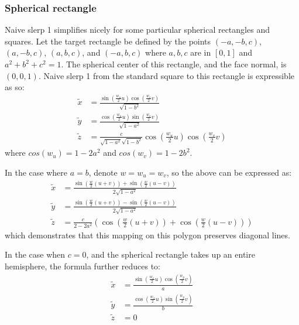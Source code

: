 \documentclass{amsart}[12pt]
\begin{document}
\subsubsection{Spherical rectangle}
Naive slerp 1 simplifies nicely for some particular spherical rectangles and
squares. Let the target rectangle be defined by the points $(-a,-b,c)$,
$(a,-b,c)$, $(a,b,c)$, and $(-a,b,c)$ where $a, b, c$ are in $[0,1]$ and
$a^2 + b^2 + c^2 = 1$. The spherical center of this rectangle, and the face
normal, is $(0,0,1)$. Naive slerp 1 from the standard square to this rectangle
is expressible as so:
\begin{equation}\begin{split}
  \widetilde{x} &= \frac{\sin(\frac{w_u}{2}u) \cos(\frac{w_v}{2}v) }
    {\sqrt{1-b^2}}\\
  \widetilde{y} &= \frac{\cos(\frac{w_u}{2}u) \sin(\frac{w_v}{2}v) }
    {\sqrt{1-a^2}}\\
  \widetilde{z} &=\frac{c}{\sqrt{1-a^2}\sqrt{1-b^2}}
    \cos(\frac{w_u}{2}u) \cos(\frac{w_v}{2}v)
\end{split}\end{equation}
where $cos(w_u) = 1 - 2 a^2$ and $cos(w_v) = 1 - 2 b^2$.

In the case where $a=b$, denote $w = w_u = w_v$,
so the above can be expressed as:
\begin{equation}\begin{split}
  \widetilde{x} &= \frac{\sin\left(\frac{w}{2}(u+v)\right) +
    \sin\left(\frac{w}{2}(u-v)\right)}
    {2\sqrt{1-a^2}}\\
  \widetilde{y} &= \frac{\sin\left(\frac{w}{2}(u+v)\right) -
    \sin\left(\frac{w}{2}(u-v)\right)}
    {2\sqrt{1-a^2}}\\
  \widetilde{z} &=\frac{c}{2-2a^2}\left(\cos\left(\frac{w}{2}(u+v)\right) +
    \cos\left(\frac{w}{2}(u-v)\right)\right)
\end{split}\end{equation}
which demonstrates that this mapping on this polygon preserves diagonal lines.

In the case when $c=0$,
and the spherical rectangle takes up an entire hemisphere, the formula further
reduces to:
\begin{equation}\begin{split}
  \widetilde{x} &= \frac{\sin(\frac{w_x}{2}u) \cos(\frac{w_y}{2}v) }
    {a}\\
  \widetilde{y} &= \frac{\cos(\frac{w_x}{2}u) \sin(\frac{w_y}{2}v) }
    {b}\\
  \widetilde{z} &=0
\end{split}\end{equation}
\end{document}
